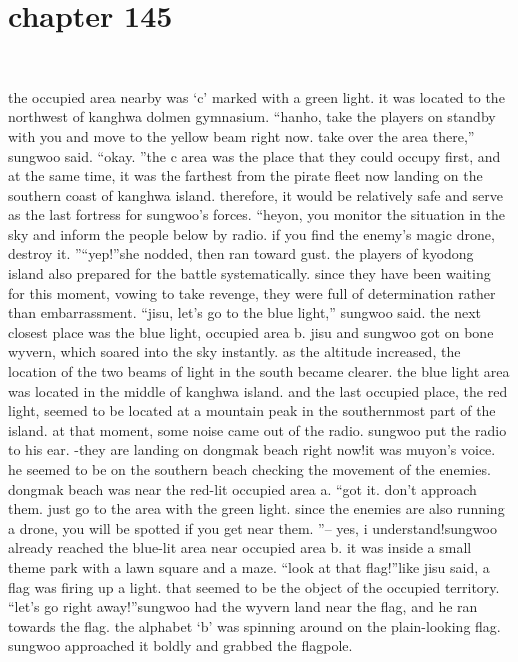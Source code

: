 \section{chapter 145}

                             




the occupied area nearby was ‘c’ marked with a green light.
 it was located to the northwest of kanghwa dolmen gymnasium.
“hanho, take the players on standby with you and move to the yellow beam right now.
 take over the area there,” sungwoo said.
“okay.
”the c area was the place that they could occupy first, and at the same time, it was the farthest from the pirate fleet now landing on the southern coast of kanghwa island.
 therefore, it would be relatively safe and serve as the last fortress for sungwoo’s forces.
“heyon, you monitor the situation in the sky and inform the people below by radio.
 if you find the enemy’s magic drone, destroy it.
”“yep!”she nodded, then ran toward gust.
 the players of kyodong island also prepared for the battle systematically.
 since they have been waiting for this moment, vowing to take revenge, they were full of determination rather than embarrassment.
“jisu, let’s go to the blue light,” sungwoo said.
the next closest place was the blue light, occupied area b.
 jisu and sungwoo got on bone wyvern, which soared into the sky instantly.
as the altitude increased, the location of the two beams of light in the south became clearer.
the blue light area was located in the middle of kanghwa island.
 and the last occupied place, the red light, seemed to be located at a mountain peak in the southernmost part of the island.
at that moment, some noise came out of the radio.
 sungwoo put the radio to his ear.
-they are landing on dongmak beach right now!it was muyon’s voice.
 he seemed to be on the southern beach checking the movement of the enemies.
 dongmak beach was near the red-lit occupied area a.
“got it.
 don’t approach them.
 just go to the area with the green light.
 since the enemies are also running a drone, you will be spotted if you get near them.
”– yes, i understand!sungwoo already reached the blue-lit area near occupied area b.
 it was inside a small theme park with a lawn square and a maze.
“look at that flag!”like jisu said, a flag was firing up a light.
 that seemed to be the object of the occupied territory.
“let’s go right away!”sungwoo had the wyvern land near the flag, and he ran towards the flag.
the alphabet ‘b’ was spinning around on the plain-looking flag.
 sungwoo approached it boldly and grabbed the flagpole.

